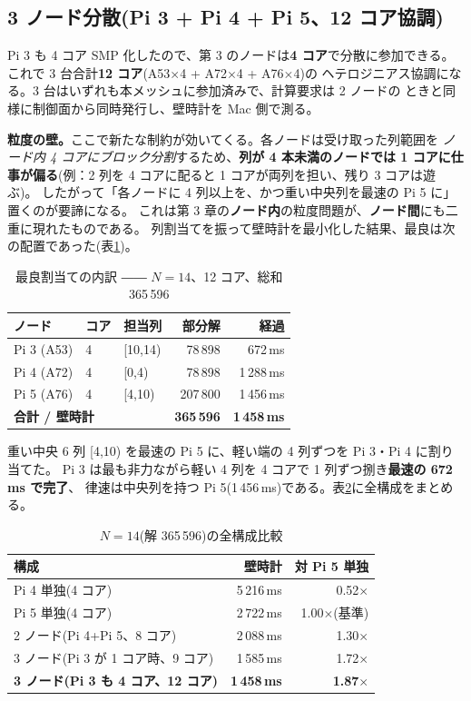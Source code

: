\subsection{3 ノード分散(Pi 3 + Pi 4 + Pi 5、12 コア協調)}
Pi 3 も 4 コア SMP 化したので、第 3 のノードは\textbf{4 コア}で分散に参加できる。
これで 3 台合計\textbf{12 コア}(A53$\times$4 + A72$\times$4 + A76$\times$4)の
ヘテロジニアス協調になる。3 台はいずれも本メッシュに参加済みで、計算要求は 2 ノードの
ときと同様に制御面から同時発行し、壁時計を Mac 側で測る。

\medskip\noindent
\textbf{粒度の壁。}ここで新たな制約が効いてくる。各ノードは受け取った列範囲を
\emph{ノード内 4 コアにブロック分割}するため、\textbf{列が 4 本未満のノードでは
1 コアに仕事が偏る}(例：2 列を 4 コアに配ると 1 コアが両列を担い、残り 3 コアは遊ぶ)。
したがって「各ノードに 4 列以上を、かつ重い中央列を最速の Pi 5 に」置くのが要諦になる。
これは第 3 章の\textbf{ノード内}の粒度問題が、\textbf{ノード間}にも二重に現れたものである。
列割当てを振って壁時計を最小化した結果、最良は次の配置であった(表\ref{tab:dist3best})。

\begin{table}[h]\centering
\caption{最良割当ての内訳 ―― $N{=}14$、12 コア、総和 365\,596 \checkmark}\label{tab:dist3best}
\small
\begin{tabular}{lllrr}
\toprule
ノード & コア & 担当列 & 部分解 & 経過 \\
\midrule
Pi 3 (A53) & 4 & [10,14) & 78\,898  &  672\,ms \\
Pi 4 (A72) & 4 & [0,4)   & 78\,898  & 1\,288\,ms \\
Pi 5 (A76) & 4 & [4,10)  & 207\,800 & 1\,456\,ms \\
\midrule
\multicolumn{3}{l}{\textbf{合計 / 壁時計}} & \textbf{365\,596} & \textbf{1\,458\,ms} \\
\bottomrule
\end{tabular}
\end{table}

\noindent
重い中央 6 列 [4,10) を最速の Pi 5 に、軽い端の 4 列ずつを Pi 3・Pi 4 に割り当てた。
Pi 3 は最も非力ながら軽い 4 列を 4 コアで 1 列ずつ捌き\textbf{最速の 672\,ms で完了}、
律速は中央列を持つ Pi 5(1\,456\,ms)である。表\ref{tab:dist-all}に全構成をまとめる。

\begin{table}[h]\centering
\caption{$N{=}14$(解 365\,596)の全構成比較}\label{tab:dist-all}
\begin{tabular}{lrr}
\toprule
構成 & 壁時計 & 対 Pi 5 単独 \\
\midrule
Pi 4 単独(4 コア)                          & 5\,216\,ms & 0.52$\times$ \\
Pi 5 単独(4 コア)                          & 2\,722\,ms & 1.00$\times$(基準) \\
2 ノード(Pi 4+Pi 5、8 コア)                 & 2\,088\,ms & 1.30$\times$ \\
3 ノード(Pi 3 が 1 コア時、9 コア)           & 1\,585\,ms & 1.72$\times$ \\
\textbf{3 ノード(Pi 3 も 4 コア、12 コア)}   & \textbf{1\,458\,ms} & \textbf{1.87$\times$} \\
\bottomrule
\end{tabular}
\end{table}

